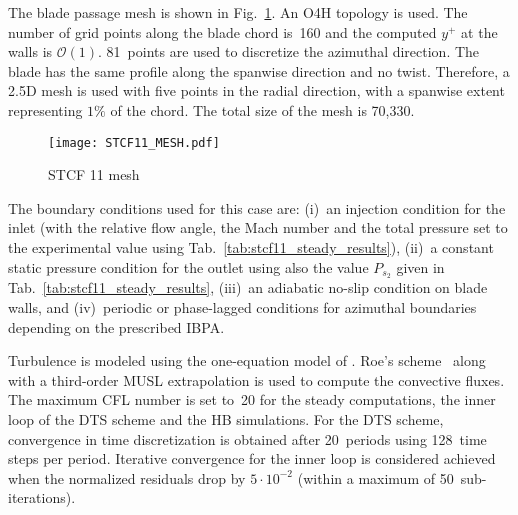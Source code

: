 
The blade passage mesh is shown in Fig.~\ref{fig:stcf11_mesh}.
An O4H topology is used.
The number of grid points along the blade
chord is~160 and the computed $y^+$ at the walls is $\mathcal{O}(1)$.
81~points are used to discretize the azimuthal direction.
The blade has the same profile along the spanwise direction and no
twist. Therefore, a 2.5D mesh is used with five points 
in the radial direction, with a spanwise
extent representing $1\%$ of the chord. 
The total size of the mesh is 70,330.
\begin{figure}[htb!]
  \centering
  \texttt{[image: STCF11\_MESH.pdf]}
  \caption{STCF 11 mesh}
  \label{fig:stcf11_mesh}
\end{figure}

The boundary conditions used for this case are: (i)~an
injection condition  for the inlet (with the relative flow angle,
the Mach number and the total pressure
set to the experimental value using Tab.~\ref{tab:stcf11_steady_results}), 
(ii)~a constant static pressure
condition for the outlet using also the value $P_{s_2}$
given in Tab.~\ref{tab:stcf11_steady_results},  
(iii)~an adiabatic no-slip condition on
blade walls, and (iv)~periodic or phase-lagged conditions 
for azimuthal boundaries depending on the  
prescribed IBPA.

Turbulence is modeled using the one-equation model of
\citet{Spalart1992}.  Roe's scheme~\cite{Roe1981} along with a 
third-order MUSL extrapolation 
is used to compute the convective fluxes.
The maximum
CFL number is set to~20 for the steady computations,  the inner loop
of the DTS scheme and the HB simulations.  For the DTS scheme,  
convergence in time discretization is obtained
after 20~periods using 128~time steps per period.  Iterative convergence 
for the inner loop is considered achieved when the normalized
residuals drop by $5\cdot 10^{-2}$ (within a maximum of
50~sub-iterations).

